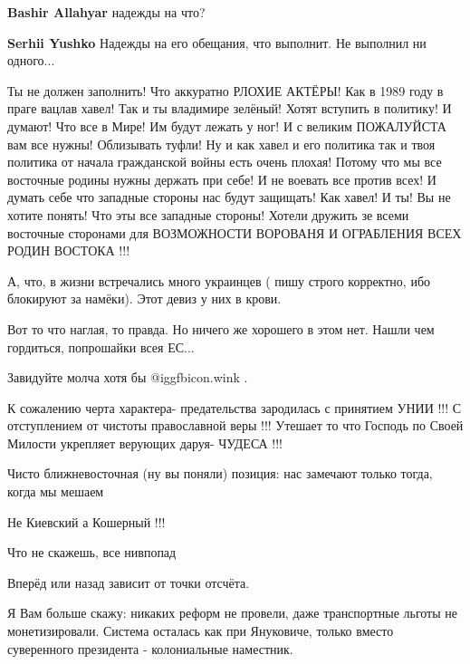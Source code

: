 \begin{itemize}
\begin{itemize} %
\textbf{Bashir Allahyar} надежды на что?

\textbf{Serhii Yushko} Надежды на его обещания, что выполнит. Не выполнил ни одного...
\end{itemize} %


Ты не должен заполнить! Что аккуратно РЛОХИЕ АКТЁРЫ! Как в 1989 году в праге
вацлав хавел! Так и ты владимире зелёный! Хотят вступить в политику! И думают!
Что все в Мире! Им будут лежать у ног! И с великим ПОЖАЛУЙСТА вам все нужны!
Облизывать туфли! Ну и как хавел и его политика так и твоя политика от начала
гражданской войны есть очень плохая! Потому что мы все восточные родины нужны
держать при себе! И не воевать все против всех! И думать себе что западные
стороны нас будут защищать! Как хавел! И ты! Вы не хотите понять! Что эты все
западные стороны! Хотели дружить зе всеми восточные сторонами для ВОЗМОЖНОСТИ
ВОРОВАНЯ И ОГРАБЛЕНИЯ ВСЕХ РОДИН ВОСТОКА !!!

А, что, в жизни встречались много украинцев ( пишу строго корректно, ибо блокируют за намёки). Этот девиз у них в крови.

Вот то что наглая, то правда. Но ничего же хорошего в этом нет. Нашли чем гордиться, попрошайки всея ЕС...

Завидуйте молча хотя бы  @igg{fbicon.wink} .


К сожалению черта характера- предательства зародилась с принятием УНИИ !!! С
отступлением от чистоты православной веры !!! Утешает то что Господь по Своей
Милости укрепляет верующих даруя- ЧУДЕСА !!!

Чисто ближневосточная (ну вы поняли) позиция: нас замечают только тогда, когда мы мешаем

Не Киевский а Кошерный !!!

Что не скажешь, все нивпопад

Вперёд или назад зависит от точки отсчёта.


Я Вам больше скажу: никаких реформ не провели, даже транспортные льготы не
монетизировали. Система осталась как при Януковиче, только вместо суверенного
президента - колониальные наместник.


\end{itemize}
